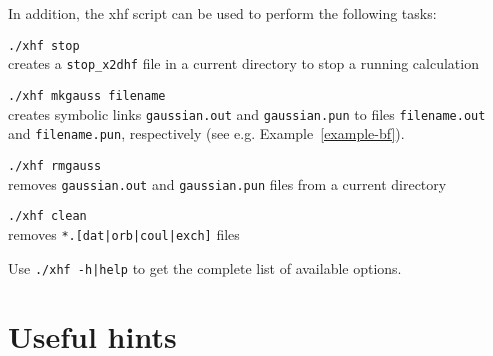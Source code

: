 \documentclass[12pt,a4paper]{article}
\newcommand{\ft}[1]{\texttt{#1}}
\begin{document}
In addition, the xhf script can be used to perform the following
tasks:

\begin{description}
\item \hspace*{0.5cm} \texttt{./xhf stop}\\ creates a
  \texttt{stop\_x2dhf} file in a current directory to stop a running
  calculation %
\end{description}

\begin{description}
\item \hspace*{0.5cm} \texttt{./xhf mkgauss filename}\\ creates
  symbolic links \texttt{gaussian.out} and \texttt{gaussian.pun} to
  files \texttt{filename.\-out} and \texttt{filename.pun},
  respectively (see e.g. Example~\ref{example-bf}).
\end{description}

\begin{description}
\item \hspace*{0.5cm} \texttt{./xhf rmgauss}\\ removes
  \texttt{gaussian.out} and \texttt{gaussian.pun} files from a current
  directory
\end{description}

\begin{description}
\item \hspace*{0.5cm} \texttt{./xhf clean} \\ removes
  \texttt{*.[dat|orb|coul|exch]} files
\end{description}

Use \ft{./xhf -h|help} to get the complete list of available options.

\section{Useful hints}
\end{document}
